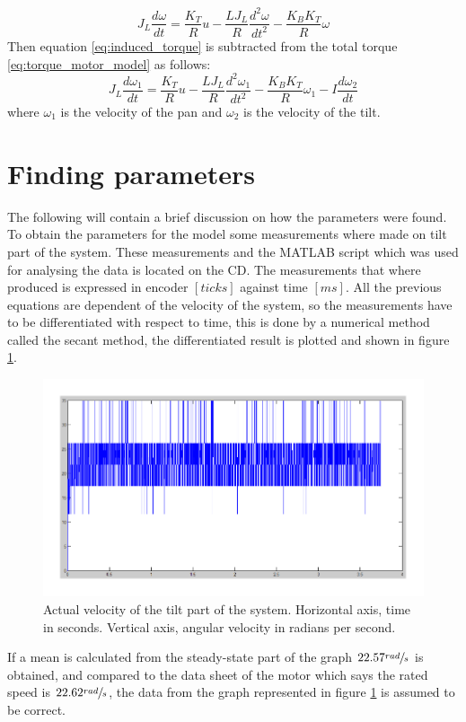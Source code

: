 \begin{equation}
	J_L \frac{d\omega}{dt} = \frac{K_T}{R} u - \frac{L J_L}{R} \frac{d^{2}\omega}{dt^{2}} - \frac{K_B K_T}{R} \omega\label{eq:torque_motor_model}
\end{equation}
Then equation \ref{eq:induced_torque} is subtracted from the total torque \ref{eq:torque_motor_model} as follows:
\begin{equation}
	J_L \frac{d\omega_{1}}{dt} = \frac{K_T}{R} u - \frac{L J_L}{R} \frac{d^{2}\omega_{1}}{dt^{2}} - \frac{K_B K_T}{R} \omega_{1} - I \frac{d\omega_{2}}{dt}\label{eq:coupled_torque_motor_model}
\end{equation}
where $\omega_1$ is the velocity of the pan and $\omega_2$ is the velocity of the tilt. 

\section{Finding parameters}
The following will contain a brief discussion on how the parameters were found. To obtain the parameters for the model some measurements where made on tilt part of the system. These measurements and the MATLAB script which was used for analysing the data is located on the CD. The measurements that where produced is expressed in encoder $[ticks]$ against time $[ms]$. All the previous equations are dependent of the velocity of the system, so the measurements have to be differentiated with respect to time, this is done by a numerical method called the secant method, the differentiated result is plotted and shown in figure \ref{fig:measured_step_tilt}.
\begin{figure}[htb]
	\centering
	\includegraphics[width=\textwidth]{graphics/measured_step_tilt.pdf} %
	\caption{Actual velocity of the tilt part of the system. Horizontal axis, time in seconds. Vertical axis, angular velocity in radians per second.}
	\label{fig:measured_step_tilt}			%
\end{figure}
If a mean is calculated from the steady-state part of the graph $22.57 \sfrac{rad}{s}$ is obtained, and compared to the data sheet of the motor which says the rated speed is $22.62 \sfrac{rad}{s}$, the data from the graph represented in figure \ref{fig:measured_step_tilt} is assumed to be correct.

